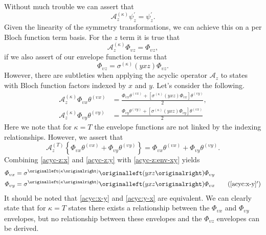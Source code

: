Without much trouble we can assert that
\begin{equation}
  \mathcal{A}_{z}^{\left(\kappa\right)}\psi_{z}^{\prime} = \psi_{z}^{\prime}.
\end{equation}
Given the linearity of the symmetry transformations, we can achieve this on a
per Bloch function term basis. For the $z$ term it is true that
\begin{equation} 
  \mathcal{A}_{z}^{\left(\kappa\right)}\Phi_{\upsilon z} = \Phi_{\upsilon z}
\label{acyc-z:env-z}
,
\end{equation}
if we also assert of our envelope function terms that
\begin{equation}
\Phi_{\upsilon z}
  =
    \sigma^{\left(\kappa\right)}\left(yxz\right)\Phi_{\upsilon z}
\label{acyc:z}
.
\end{equation}
However, there are subtleties when applying the acyclic operator
$\mathcal{A}_{z}$ to states with Bloch function factors indexed by $x$ and $y$.
Let's consider the following.
\begin{align}
  \mathcal{A}_{z}^{\left(\kappa\right)}
  \Phi_{\upsilon x}\theta^{\left(\upsilon x\right)}
  & =
  \frac
  {
    \Phi_{\upsilon x}
    \theta^{\left(\upsilon x\right)}
    + 
    \left[\sigma^{\left(\kappa\right)}\left(yxz\right)\Phi_{\upsilon x}\right]
    \theta^{\left(\upsilon y\right)}
  }
  {2}
\label{acyc-z:x}
,\\
  \mathcal{A}_{z}^{\left(\kappa\right)}
  \Phi_{\upsilon y}\theta^{\left(\upsilon y\right)}
  & =
  \frac
  {
    \Phi_{\upsilon y}
    \theta^{\left(\upsilon y\right)}
    + 
    \left[\sigma^{\left(\kappa\right)}\left(yxz\right)\Phi_{\upsilon y}\right]
    \theta^{\left(\upsilon x\right)}
  }
  {2}
\label{acyc-z:y}
\end{align}
Here we note that for $\kappa = T$ the envelope functions are not linked by the
indexing relationships. However, we assert that
\begin{equation}
  \mathcal{A}_{z}^{\left(T\right)}
  \left\{ 
    \Phi_{\upsilon x}\theta^{\left(\upsilon x\right)}
      +
    \Phi_{\upsilon y}\theta^{\left(\upsilon y\right)}
  \right\}
= 
  \Phi_{\upsilon x}\theta^{\left(\upsilon x\right)}
    +
  \Phi_{\upsilon y}\theta^{\left(\upsilon y\right)}
.
\label{acyc-z:env-xy}
\end{equation}
Combining \eqref{acyc-z:x} and \eqref{acyc-z:y} with \eqref{acyc-z:env-xy}
yields
\begin{align}
  \Phi_{\upsilon x}
  &=
  \sigma^{\left(\kappa\right)}\left(yxz\right)\Phi_{\upsilon y}
\label{acyc:x-y}
\\
  \Phi_{\upsilon y}
  &=
  \sigma^{\left(\kappa\right)}\left(yxz\right)\Phi_{\upsilon x}
\tag{\ref{acyc:x-y}${}^{\prime}$}
\label{acyc:y-x}
\end{align}
It should be noted that \eqref{acyc:x-y} and \eqref{acyc:y-x} are equivalent. We
can clearly state that for $\kappa = T$ states there exists a relationship
between the $\Phi_{\upsilon x}$ and $\Phi_{\upsilon y}$ envelopes, but no
relationship between these envelopes and the $\Phi_{\upsilon z}$ envelopes can be
derived.

